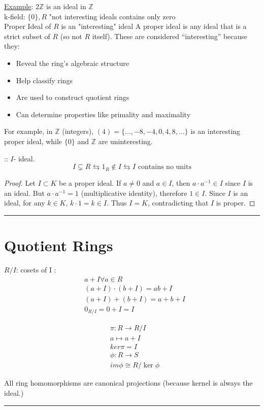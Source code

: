 \documentclass{article}
\begin{document}
\underline{Example}: $2\mathbb{Z}$ is an ideal in $\mathbb{Z}$ \\ 
k-field: $\{0\}, R$ "not interesting ideals  contains only zero
\\ 
Proper Ideal of $R$ is an "interesting" ideal 
A proper ideal is any ideal that is a strict subset of $R$ (so not $R$ itself). These are considered ``interesting'' because they:

\begin{itemize}
   \item Reveal the ring's algebraic structure
   \item Help classify rings  
   \item Are used to construct quotient rings
   \item Can determine properties like primality and maximality
\end{itemize}

For example, in $\mathbb{Z}$ (integers), $(4) = \{\ldots,-8,-4,0,4,8,\ldots\}$ is an interesting proper ideal, while $\{0\}$ and $\mathbb{Z}$ are uninteresting.


:: $I$- ideal.
$$I \subsetneq R \leftrightarrows 1_R \not \in I \leftrightarrows I \text{ contains no units}$$
\begin{proof}
    Let $I \subset K$ be a proper ideal. If $a \neq 0$ and $a \in I$, then $a \cdot a^{-1} \in I$ since $I$ is an ideal. 
    But $a \cdot a^{-1} = 1$ (multiplicative identity), therefore $1 \in I$.
    Since $I$ is an ideal, for any $k \in K$, $k \cdot 1 = k \in I$.
    Thus $I = K$, contradicting that $I$ is proper.
    \end{proof}
    \noindent\rule{\textwidth}{0.5pt}
\section{Quotient Rings}
$R / I $: cosets of I : 
\begin{align*}
    & a + I \forall a \in R \\ 
    & (a + I) \cdot (b + I) = ab + I \\ 
    & (a +I) + (b + I) = a + b + I   \\ 
    & 0_{R/I}  = 0 + I = I 
\end{align*}

\begin{definition}
    \begin{align*}
        &\pi: R \to R / I \\ 
        &a \mapsto a + I \\ 
        &ker\pi = I \\ 
        &\phi: R \to S \\ 
        &im\phi \cong R / \ker\phi
     \end{align*}
    
\end{definition}
All ring homomorphisms are canonical projections (because kernel is always the ideal.)
\noindent\rule{\textwidth}{0.5pt}
\end{document}
